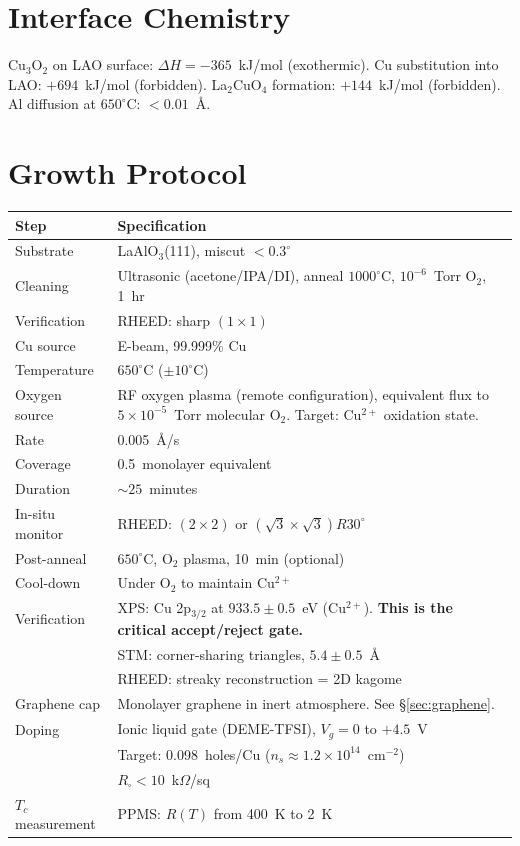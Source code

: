 \documentclass[11pt, a4paper]{article}
\begin{document}
\section{Interface Chemistry}

Cu$_3$O$_2$ on LAO surface: $\Delta H = -365$~kJ/mol
(exothermic). Cu substitution into LAO: $+694$~kJ/mol
(forbidden). La$_2$CuO$_4$ formation: $+144$~kJ/mol
(forbidden). Al diffusion at $650^\circ$C: $< 0.01$~\AA.

\section{Growth Protocol}

\begin{center}
\begin{tabular}{@{}lp{8cm}@{}}
\toprule
\textbf{Step} & \textbf{Specification} \\
\midrule
Substrate & LaAlO$_3$(111), miscut $< 0.3^\circ$ \\
Cleaning & Ultrasonic (acetone/IPA/DI), anneal $1000^\circ$C,
  $10^{-6}$~Torr O$_2$, 1~hr \\
Verification & RHEED: sharp $(1 \times 1)$ \\
\midrule
Cu source & E-beam, 99.999\% Cu \\
Temperature & $650^\circ$C ($\pm 10^\circ$C) \\
Oxygen source & RF oxygen plasma (remote configuration),
  equivalent flux to $5 \times 10^{-5}$~Torr molecular O$_2$.
  Target: Cu$^{2+}$ oxidation state. \\
Rate & 0.005~\AA/s \\
Coverage & 0.5~monolayer equivalent \\
Duration & $\sim 25$~minutes \\
In-situ monitor & RHEED: $(2 \times 2)$ or
  $(\sqrt{3} \times \sqrt{3})R30^\circ$ \\
\midrule
Post-anneal & $650^\circ$C, O$_2$ plasma, 10~min (optional) \\
Cool-down & Under O$_2$ to maintain Cu$^{2+}$ \\
\midrule
Verification & XPS: Cu 2p$_{3/2}$ at $933.5 \pm 0.5$~eV
  (Cu$^{2+}$). \textbf{This is the critical accept/reject
  gate.} \\
 & STM: corner-sharing triangles, $5.4 \pm 0.5$~\AA \\
 & RHEED: streaky reconstruction = 2D kagome \\
\midrule
Graphene cap & Monolayer graphene in inert atmosphere.
  See \S\ref{sec:graphene}. \\
\midrule
Doping & Ionic liquid gate (DEME-TFSI),
  $V_g = 0$ to $+4.5$~V \\
 & Target: 0.098~holes/Cu
  ($n_s \approx 1.2 \times 10^{14}$~cm$^{-2}$) \\
 & $R_\square < 10$~k$\Omega$/sq \\
\midrule
$T_c$ measurement & PPMS: $R(T)$ from 400~K to 2~K \\
\bottomrule
\end{tabular}
\end{center}
\end{document}

